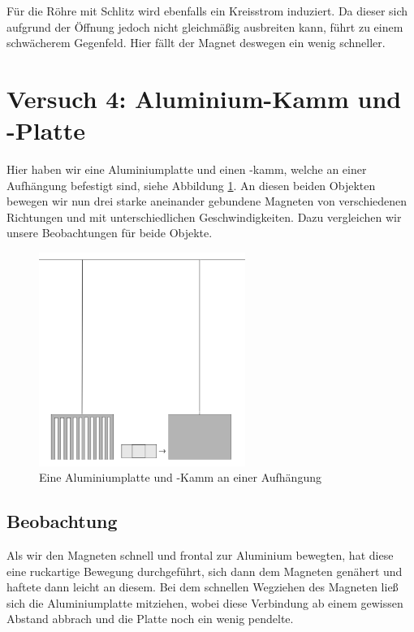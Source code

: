 \documentclass[11pt,a4paper,titlepage, ngerman]{article}
\begin{document}
			Für die Röhre mit Schlitz wird ebenfalls ein Kreisstrom induziert. Da dieser sich aufgrund der Öffnung jedoch nicht gleichmäßig ausbreiten kann, führt zu einem schwächerem Gegenfeld. Hier fällt der Magnet deswegen ein wenig schneller.		
					
	\section{Versuch 4: Aluminium-Kamm und -Platte} 
	
		Hier haben wir eine Aluminiumplatte und einen -kamm, welche an einer Aufhängung befestigt sind, siehe Abbildung \ref{fig:Aluplatte}. An diesen beiden Objekten bewegen wir nun drei starke aneinander gebundene Magneten von verschiedenen Richtungen und mit unterschiedlichen Geschwindigkeiten.
		Dazu vergleichen wir unsere Beobachtungen für beide Objekte.
		
		\begin{figure}
			\centering
			\includegraphics[width=0.6\textwidth]{Alu-Platte.png}
			\caption{Eine Aluminiumplatte und -Kamm an einer Aufhängung} 
			\label{fig:Aluplatte}
		\end{figure}
		
		\subsection*{Beobachtung}
		
			Als wir den Magneten schnell und frontal zur Aluminium bewegten, hat diese eine ruckartige Bewegung durchgeführt, sich dann dem Magneten genähert und haftete dann leicht an diesem. Bei dem schnellen Wegziehen des Magneten ließ sich die Aluminiumplatte mitziehen, wobei diese Verbindung ab einem gewissen Abstand abbrach und die Platte noch ein wenig pendelte. 
			
\end{document}
